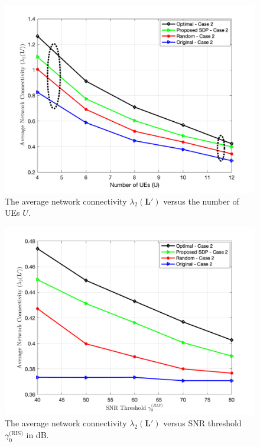 \documentclass[conference]{IEEEtran}
\begin{document}
\begin{figure}[t!]
			\begin{center}
				\includegraphics[width=0.95\linewidth, draft=false]{FigUEscase2.png}
				\caption{The average network connectivity $\lambda_2(\mathbf L')$ versus the number of UEs $U$.}
     \vspace{-5.5mm}
			\end{center}
   \label{fig3_case2}
		\end{figure}

\begin{figure}[t!]
			\begin{center}
				\includegraphics[width=0.95\linewidth, draft=false]{FigSNRcase2.png}
				\caption{The average network connectivity $\lambda_2(\mathbf L')$ versus SNR threshold $\gamma_0^\text{(RIS)}$ in dB.}
     \vspace{-5.5mm}
			\end{center}
   \label{fig3_case2}
		\end{figure}
\end{document}

